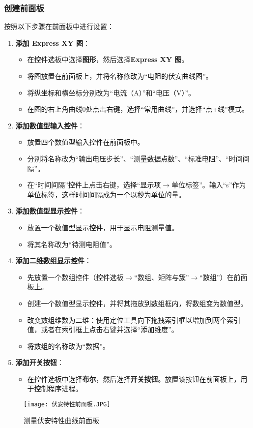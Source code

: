 \documentclass[UTF-8,twoside,cs4size]{ctexart}
\begin{document}
\subsubsection{创建前面板}
按照以下步骤在前面板中进行设置：
\begin{enumerate}
    \item \textbf{添加 Express XY 图}：
    \begin{itemize}
        \item 在控件选板中选择\textbf{图形}，然后选择\textbf{Express XY 图}。
        \item 将图放置在前面板上，并将名称修改为“电阻的伏安曲线图”。
        \item 将纵坐标和横坐标分别改为“电流（A）”和“电压（V）”。
        \item 在图的右上角曲线0处点击右键，选择“常用曲线”，并选择“点+线”模式。
    \end{itemize}
    
    \item \textbf{添加数值型输入控件}：
    \begin{itemize}
        \item 放置四个数值型输入控件在前面板中。
        \item 分别将名称改为“输出电压步长”、“测量数据点数”、“标准电阻”、“时间间隔”。
        \item 在“时间间隔”控件上点击右键，选择“显示项$\rightarrow$单位标签”。输入“s”作为单位标签，这样时间间隔成为一个以秒为单位的量。
    \end{itemize}

    \item \textbf{添加数值型显示控件}：
    \begin{itemize}
        \item 放置一个数值型显示控件，用于显示电阻测量值。
        \item 将其名称改为“待测电阻值”。
    \end{itemize}

    \item \textbf{添加二维数组显示控件}：
    \begin{itemize}
        \item 先放置一个数组控件（控件选板$\rightarrow$“数组、矩阵与簇”$\rightarrow$“数组”）在前面板上。
        \item 创建一个数值型显示控件，并将其拖放到数组框内，将数组变为数值型。
        \item 改变数组维数为二维：使用定位工具向下拖拽索引框以增加到两个索引值，或者在索引框上点击右键并选择“添加维度”。
        \item 将数组的名称改为“数据”。
    \end{itemize}

    \item \textbf{添加开关按钮}：
    \begin{itemize}
        \item 在控件选板中选择\textbf{布尔}，然后选择\textbf{开关按钮}。放置该按钮在前面板上，用于控制程序进程。
    \end{itemize}
\end{enumerate}
\begin{figure}[!h]
    \centering
    \texttt{[image: 伏安特性前面板.JPG]}
    \caption{测量伏安特性曲线前面板}
\end{figure}
\end{document}
